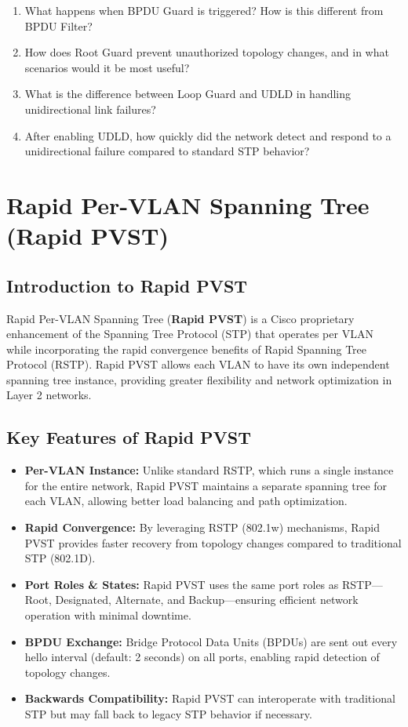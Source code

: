 \documentclass[a4paper]{book}
\begin{document}
\begin{enumerate}
	\item What happens when BPDU Guard is triggered? How is this different from BPDU Filter?
	\item How does Root Guard prevent unauthorized topology changes, and in what scenarios would it be most useful?
	\item What is the difference between Loop Guard and UDLD in handling unidirectional link failures?
	\item After enabling UDLD, how quickly did the network detect and respond to a unidirectional failure compared to standard STP behavior?
\end{enumerate}


\chapter{Rapid Per-VLAN Spanning Tree (Rapid PVST)}




\section*{Introduction to Rapid PVST}
Rapid Per-VLAN Spanning Tree (\textbf{Rapid PVST}) is a Cisco proprietary enhancement of the Spanning Tree Protocol (STP) that operates per VLAN while incorporating the rapid convergence benefits of Rapid Spanning Tree Protocol (RSTP). Rapid PVST allows each VLAN to have its own independent spanning tree instance, providing greater flexibility and network optimization in Layer 2 networks.

\section*{Key Features of Rapid PVST}
\begin{itemize}
	\item \textbf{Per-VLAN Instance:} Unlike standard RSTP, which runs a single instance for the entire network, Rapid PVST maintains a separate spanning tree for each VLAN, allowing better load balancing and path optimization.
	\item \textbf{Rapid Convergence:} By leveraging RSTP (802.1w) mechanisms, Rapid PVST provides faster recovery from topology changes compared to traditional STP (802.1D).
	\item \textbf{Port Roles \& States:} Rapid PVST uses the same port roles as RSTP—Root, Designated, Alternate, and Backup—ensuring efficient network operation with minimal downtime.
	\item \textbf{BPDU Exchange:} Bridge Protocol Data Units (BPDUs) are sent out every hello interval (default: 2 seconds) on all ports, enabling rapid detection of topology changes.
	\item \textbf{Backwards Compatibility:} Rapid PVST can interoperate with traditional STP but may fall back to legacy STP behavior if necessary.
\end{itemize}
\end{document}
